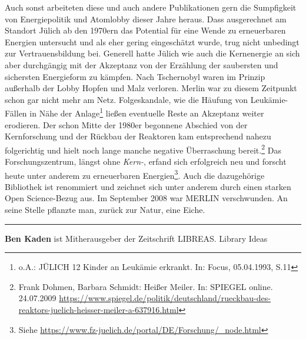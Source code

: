 \documentclass[a4paper,
fontsize=11pt,
oneside,
numbers=noperiodatend,
parskip=half-,
bibliography=totoc,
final
]{scrartcl}
\begin{document}
Auch sonst arbeiteten diese und auch andere Publikationen gern die
Sumpfigkeit von Energiepolitik und Atomlobby dieser Jahre heraus. Dass
ausgerechnet am Standort Jülich ab den 1970ern das Potential für eine
Wende zu erneuerbaren Energien untersucht und als eher gering
eingeschätzt wurde, trug nicht unbedingt zur Vertrauensbildung bei.
Generell hatte Jülich wie auch die Kernenergie an sich aber durchgängig
mit der Akzeptanz von der Erzählung der saubersten und sichersten
Energieform zu kämpfen. Nach Tschernobyl waren im Prinzip außerhalb der
Lobby Hopfen und Malz verloren. Merlin war zu diesem Zeitpunkt schon gar
nicht mehr am Netz. Folgeskandale, wie die Häufung von Leukämie-Fällen
in Nähe der Anlage\footnote{o.A.: JÜLICH 12 Kinder an Leukämie erkrankt.
  In: Focus, 05.04.1993, S.11} ließen eventuelle Reste an Akzeptanz
weiter erodieren. Der schon Mitte der 1980er begonnene Abschied von der
Kernforschung und der Rückbau der Reaktoren kam entsprechend nahezu
folgerichtig und hielt noch lange manche negative Überraschung
bereit.\footnote{Frank Dohmen, Barbara Schmidt: Heißer Meiler. In:
  SPIEGEL online. 24.07.2009
  \url{https://www.spiegel.de/politik/deutschland/rueckbau-des-reaktors-juelich-heisser-meiler-a-637916.html}}
Das Forschungszentrum, längst ohne \emph{Kern-}, erfand sich erfolgreich
neu und forscht heute unter anderem zu erneuerbaren Energien\footnote{Siehe
  \url{https://www.fz-juelich.de/portal/DE/Forschung/_node.html}}. Auch
die dazugehörige Bibliothek ist renommiert und zeichnet sich unter
anderem durch einen starken Open Science-Bezug aus. Im September 2008
war MERLIN verschwunden. An seine Stelle pflanzte man, zurück zur Natur,
eine Eiche.

\begin{center}\rule{0.5\linewidth}{0.5pt}\end{center}

\textbf{Ben Kaden} ist Mitherausgeber der Zeitschrift LIBREAS. Library
Ideas
\end{document}
